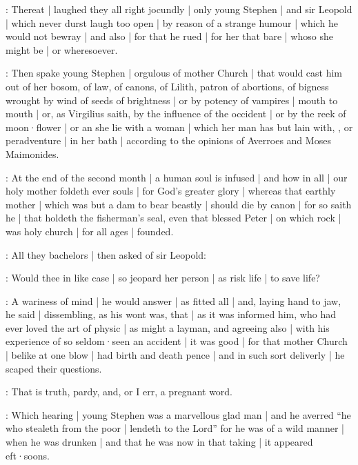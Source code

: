 :
Thereat |
laughed they all right jocundly |
only young Stephen |
and sir Leopold |
which never durst laugh too open |
by reason of a strange humour |
which he would not bewray |
and also |
for that he rued |
for her that bare |
whoso she might be |
or wheresoever.

:
Then spake young Stephen |
orgulous of mother Church |
that would cast him out of her bosom,
of law,
of canons,
of Lilith,
patron of abortions,
of bigness wrought by wind of seeds of brightness |
or by potency of vampires |
mouth to mouth |
or,
as Virgilius saith,
by the influence of the occident |
or by the reek of moon·flower |
or an she lie with a woman |
which her man has but lain with,
,
or peradventure |
in her bath |
according to the opinions of Averroes and Moses Maimonides.

\stephen:
At the end of the second month |
a human soul is infused |
and how in all |
our holy mother foldeth ever souls |
for God's greater glory |
whereas that earthly mother |
which was but a dam to bear beastly |
should die by canon |
for so saith he |
that holdeth the fisherman's seal,
even that blessed Peter |
on which rock |
was holy church |
for all ages |
founded.

:
All they bachelors |
then asked of sir Leopold:

\All:
Would thee in like case |
so jeopard her person |
as risk life |
to save life?

:
A wariness of mind |
he would answer |
as fitted all |
and,
laying hand to jaw,
he said |
dissembling,
as his wont was,
that |
as it was informed him,
who had ever loved the art of physic |
as might a layman,
and agreeing also |
with his experience of so seldom·seen an accident |
it was good |
for that mother Church |
belike at one blow |
had birth and death pence |
and in such sort deliverly |
he scaped their questions.

\dixon:
That is truth,
pardy,
and,
or I err,
a pregnant word.

:
Which hearing |
young Stephen was a marvellous glad man |
and he averred
“he who stealeth from the poor |
lendeth to the Lord”
for he was of a wild manner |
when he was drunken |
and that he was now in that taking |
it appeared eft·soons.


